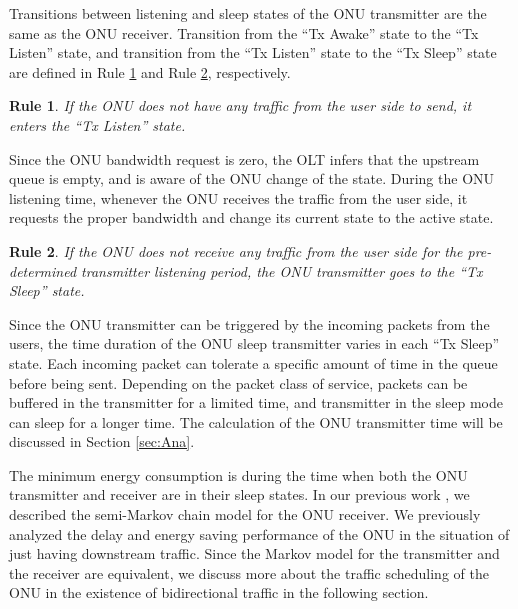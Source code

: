 \documentclass[11pt,english,12pt,onecolumn, draftcls]{IEEEtran}
\theoremstyle{plain}
\newtheorem{lem}{Rule}
\theoremstyle{definition}
\begin{document}
Transitions between listening and sleep states of the ONU transmitter are the same as the ONU receiver.  Transition from the ``Tx Awake'' state to the ``Tx Listen'' state, and transition from the ``Tx Listen'' state to the ``Tx Sleep'' state are defined in Rule \ref{Lemma:3} and Rule \ref{Lemma:4}, respectively.

\begin{lem}
\label{Lemma:3}
If the ONU does not have any traffic from the user side to send, it enters the ``Tx Listen'' state.
\end{lem}

Since the ONU bandwidth request is zero, the OLT infers that the upstream queue is empty, and is aware of the ONU change of the state. During the ONU listening time, whenever the ONU receives the traffic from the user side, it requests the proper bandwidth and change its current state to the active state.

\begin{lem}
\label{Lemma:4}
If the ONU does not receive any traffic from the user side for the pre-determined transmitter listening period, the ONU transmitter goes to the ``Tx Sleep'' state.
\end{lem}

Since the ONU transmitter can be triggered by the incoming packets from the users, the time duration of the ONU sleep transmitter varies in each ``Tx Sleep'' state. Each incoming packet can tolerate a specific amount of time in the queue before being sent. Depending on the packet class of service, packets can be buffered in the transmitter for a limited time, and transmitter in the sleep mode can sleep for a longer time. The calculation of the ONU transmitter time will be discussed in Section \ref{sec:Ana}.

The minimum energy consumption is during the time when both the ONU transmitter and receiver are in their sleep states. In our previous work \cite{Mina2013}, we described the semi-Markov chain model for the ONU receiver. We previously analyzed the delay and energy saving performance of the ONU in the situation of just having downstream traffic.  Since the Markov model for the transmitter and the receiver are equivalent, we discuss more about the traffic scheduling of the ONU in the existence of bidirectional traffic in the following section.
\end{document}
